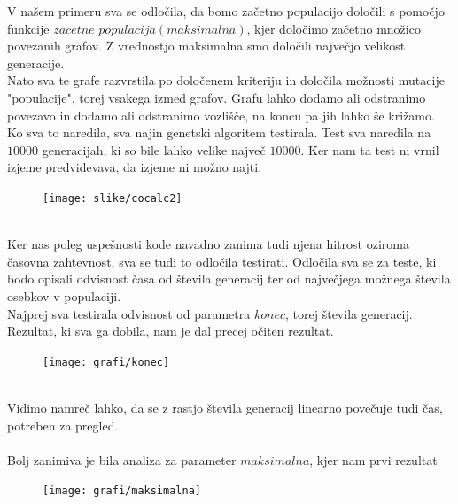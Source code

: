 \documentclass[12pt,a4paper]{amsart}
\theoremstyle{definition} %
\theoremstyle{plain} %
\begin{document}
V našem primeru sva se odločila, da bomo začetno populacijo določili s pomočjo funkcije $zacetne\_populacija(maksimalna)$,  kjer določimo začetno množico povezanih grafov. Z vrednostjo maksimalna smo določili največjo velikost generacije.\\
Nato sva te grafe razvrstila po določenem kriteriju in določila možnosti mutacije "populacije", torej vsakega izmed grafov. Grafu lahko dodamo ali odstranimo povezavo in dodamo ali odstranimo vozlišče, na koncu pa jih lahko še križamo.\\
Ko sva to naredila, sva najin genetski algoritem testirala.
Test sva naredila na $10000$ generacijah, ki so bile lahko velike največ $10000$. Ker nam ta test ni vrnil izjeme predvidevava, da izjeme ni možno najti.\\
\begin{figure}[h]
	\texttt{[image: slike/cocalc2]}
\end{figure}

\ \\
Ker nas poleg uspešnosti kode navadno zanima tudi njena hitrost oziroma časovna zahtevnost, sva se tudi to odločila testirati. Odločila sva se za teste, ki bodo opisali odvisnost časa od števila generacij ter od največjega možnega števila osebkov v populaciji.\\
Najprej sva testirala odvisnost od parametra $konec$, torej števila generacij. Rezultat, ki sva ga dobila, nam je dal precej očiten rezultat.
\begin{figure}[h]
	\texttt{[image: grafi/konec]}
\end{figure}
\ \\
Vidimo namreč lahko, da se z rastjo števila generacij linearno povečuje tudi čas, potreben za pregled.
\\
\ \\
Bolj zanimiva je bila analiza za parameter $maksimalna$, kjer nam prvi rezultat
\begin{figure}[h]
	\texttt{[image: grafi/maksimalna]}
\end{figure}
\ \\
\end{document}
